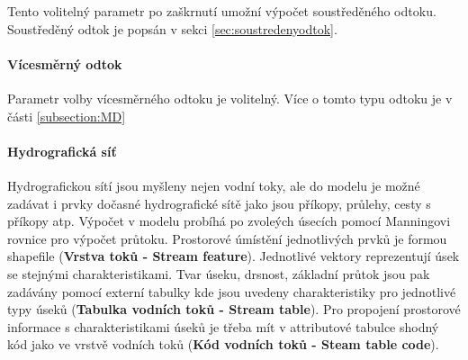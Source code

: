 Tento volitelný parametr po zaškrnutí umožní výpočet soustředěného odtoku. Soustředěný odtok je popsán v sekci \ref{sec:soustredenyodtok}.

\paragraph{Vícesměrný odtok} \label{sec:vstupvicesmerny}

Parametr volby vícesměrného odtoku je volitelný. Více o tomto typu odtoku je v části \ref{subsection:MD}


\paragraph{Hydrografická síť} \label{sec:vodnitoky}

Hydrografickou sítí jsou myšleny nejen vodní toky, ale do modelu je možné zadávat i prvky dočasné hydrografické sítě jako jsou příkopy, průlehy, cesty s příkopy atp. Výpočet v modelu probíhá po zvoleých úsecích pomocí Manningovi rovnice pro výpočet průtoku. Prostorové úmístění jednotlivých prvků je formou shapefile (\textbf{Vrstva toků - Stream feature}). Jednotlivé vektory reprezentují úsek se stejnými charakteristikami. Tvar úseku, drsnost, základní průtok jsou pak zadávány pomocí externí tabulky kde jsou uvedeny charakteristiky pro jednotlivé typy úseků (\textbf{Tabulka vodních toků - Stream table}). Pro propojení prostorové informace s charakteristikami úseků je třeba mít v attributové tabulce shodný kód jako ve vrstvě vodních toků (\textbf{Kód vodních toků - Steam table code}).